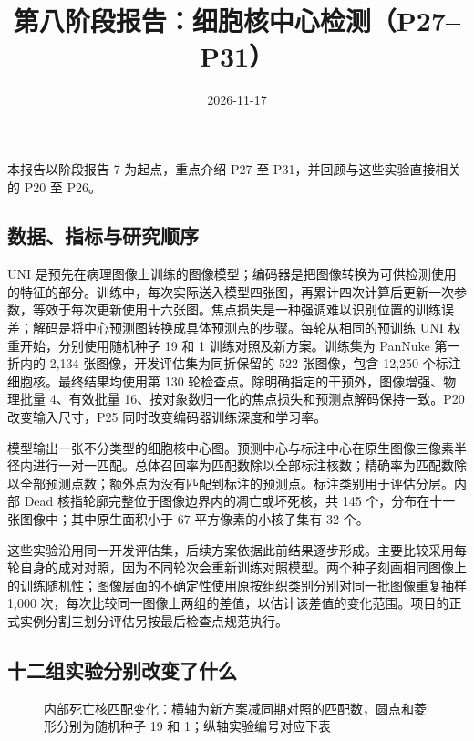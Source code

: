 \documentclass[
  11pt,
  fontset=fandol]{ctexart}
\title{第八阶段报告：细胞核中心检测（P27--P31）}
\author{}
\date{2026-11-17}
\begin{document}
\maketitle

{
\setcounter{tocdepth}{2}
\tableofcontents
}
本报告以阶段报告 7 为起点，重点介绍 P27 至
P31，并回顾与这些实验直接相关的 P20 至 P26。

\subsection{数据、指标与研究顺序}\label{ux6570ux636eux6307ux6807ux4e0eux7814ux7a76ux987aux5e8f}

UNI
是预先在病理图像上训练的图像模型；编码器是把图像转换为可供检测使用的特征的部分。训练中，每次实际送入模型四张图，再累计四次计算后更新一次参数，等效于每次更新使用十六张图。焦点损失是一种强调难以识别位置的训练误差；解码是将中心预测图转换成具体预测点的步骤。每轮从相同的预训练
UNI 权重开始，分别使用随机种子 19 和 1 训练对照及新方案。训练集为
PanNuke 第一折内的 2,134 张图像，开发评估集为同折保留的 522 张图像，包含
12,250 个标注细胞核。最终结果均使用第 130
轮检查点。除明确指定的干预外，图像增强、物理批量 4、有效批量
16、按对象数归一化的焦点损失和预测点解码保持一致。P20 改变输入尺寸，P25
同时改变编码器训练深度和学习率。

模型输出一张不分类型的细胞核中心图。预测中心与标注中心在原生图像三像素半径内进行一对一匹配。总体召回率为匹配数除以全部标注核数；精确率为匹配数除以全部预测点数；额外点为没有匹配到标注的预测点。标注类别用于评估分层。内部
Dead 核指轮廓完整位于图像边界内的凋亡或坏死核，共 145
个，分布在十一张图像中；其中原生面积小于 67 平方像素的小核子集有 32 个。

这些实验沿用同一开发评估集，后续方案依据此前结果逐步形成。主要比较采用每轮自身的成对对照，因为不同轮次会重新训练对照模型。两个种子刻画相同图像上的训练随机性；图像层面的不确定性使用原按组织类别分别对同一批图像重复抽样
1,000
次，每次比较同一图像上两组的差值，以估计该差值的变化范围。项目的正式实例分割三划分评估另按最后检查点规范执行。

\subsection{十二组实验分别改变了什么}\label{ux5341ux4e8cux7ec4ux5b9eux9a8cux5206ux522bux6539ux53d8ux4e86ux4ec0ux4e48}

\begin{figure}[H]\centering

\caption{内部死亡核匹配变化：横轴为新方案减同期对照的匹配数，圆点和菱形分别为随机种子 19 和 1；纵轴实验编号对应下表}
\end{figure}
\end{document}
